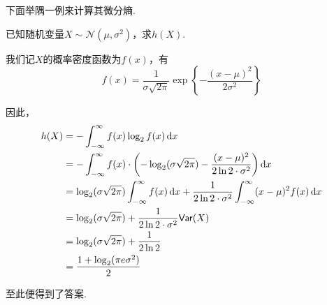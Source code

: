 下面举隅一例来计算其微分熵.
\begin{example}
    已知随机变量$X \sim \mathcal{N}(\mu, \sigma^2)$，求$h(X)$.
\end{example}
\begin{solution}
    我们记$X$的概率密度函数为$f(x)$，有 
\[
f(x) = \dfrac{1}{\sigma \sqrt{2\pi}} \exp\left\{
    -\dfrac{(x - \mu)^2}{2 \sigma^2}
    \right\}
\]
 
因此， 
\begin{align*}
    h(X) & = -\int_{-\infty}^{\infty} f(x) \log_2 f(x) \mathop{}\!\mathrm{d}x \\
    & = -\int_{-\infty}^{\infty} f(x) \cdot \left(
        -\log_2(\sigma \sqrt{2\pi}) - \dfrac{(x - \mu)^2}{2 \ln 2\cdot \sigma^2}
    \right) \mathop{}\!\mathrm{d}x \\
    & = \log_2(\sigma \sqrt{2\pi}) \int_{-\infty}^{\infty} f(x)\mathop{}\!\mathrm{d}x + \dfrac{1}{2 \ln 2\cdot \sigma^2} \int_{-\infty}^{\infty} (x-\mu)^2 f(x)\mathop{}\!\mathrm{d}x \\
    & = \log_2(\sigma \sqrt{2\pi}) + \dfrac{1}{2 \ln 2\cdot \sigma^2} \mathsf{Var}(X) \\
    & = \log_2(\sigma \sqrt{2\pi}) + \dfrac{1}{2 \ln 2} \\ 
    & = \dfrac{1 + \log_2(\pi e \sigma^2)}{2}
\end{align*}

至此便得到了答案.
\end{solution}


